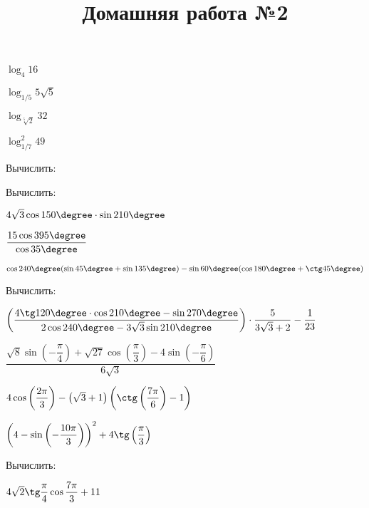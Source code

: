 \begin{listofex}
\begin{enumcols}[itemcolumns=4]
		\item \( \log_4 16 \)
		\item \( \log_{1/5}5\sqrt{5} \)
		\item \( \log_{\sqrt[5]{2}}32 \)
		\item \( \log_{1/7}^2 49 \)
	\end{enumcols}
	\item Вычислить:
	\begin{enumcols}[itemcolumns=1]
		\item {}
		\item {}
	\end{enumcols}
	\item {}
\end{listofex}
\newpage
\title{Домашняя работа №2}
\begin{listofex}
	\item Вычислить:
	\begin{enumcols}[itemcolumns=1]
		\item \( 4\sqrt{3}\cos150\degree\cdot\sin210\degree \) 
		\item \( \dfrac{15\cos395\degree}{\cos35\degree} \)
		\item \( \cos240\degree(\sin45\degree+\sin135\degree)-\sin60\degree(\cos180\degree+\ctg45\degree) \)
	\end{enumcols}
	\item Вычислить:
	\begin{enumcols}[itemcolumns=1]
		\item \( \left( \dfrac{4\tg120\degree\cdot\cos210\degree-\sin270\degree}{2\cos240\degree-3\sqrt{3}\sin210\degree} \right)\cdot\dfrac{5}{3\sqrt{3}+2}-\dfrac{1}{23} \)
		\item \( \dfrac{\sqrt{8}\sin\left( -\dfrac{\pi}{4} \right)+\sqrt{27}\cos\left( \dfrac{\pi}{3} \right)-4\sin\left( -\dfrac{\pi}{6} \right)}{6\sqrt{3}} \) 
		\item \( 4\cos\left( \dfrac{2\pi}{3} \right)-\left( \sqrt{3}+1 \right)\left( \ctg\left( \dfrac{7\pi}{6} \right)-1 \right) \) 
		\item \( \left( 4 - \sin\left( -\dfrac{10\pi}{3} \right) \right)^2+4\tg\left( \dfrac{\pi}{3} \right) \) 
	\end{enumcols}
	\item Вычислить:
	\begin{enumcols}[itemcolumns=2]
		\item \( 4\sqrt{2}\tg\dfrac{\pi}{4}\cos\dfrac{7\pi}{3}+11 \)

\end{enumcols}
\end{listofex}
